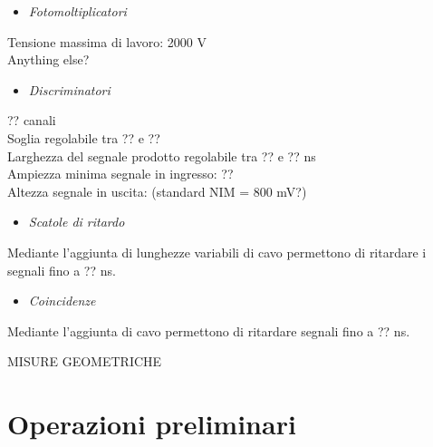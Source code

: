 \documentclass[11pt]{article}
\begin{document}
\begin{itemize}
\item \textit{Fotomoltiplicatori}
\end{itemize}
Tensione massima di lavoro: 2000 V \\
Anything else?

\begin{itemize}
\item \textit{Discriminatori}
\end{itemize}
?? canali \\
Soglia regolabile tra ?? e ?? \\
Larghezza del segnale prodotto regolabile tra ?? e ?? ns \\
Ampiezza minima segnale in ingresso: ?? \\
Altezza segnale in uscita: (standard NIM = 800 mV?) \\

\begin{itemize}
\item \textit{Scatole di ritardo}
\end{itemize}
Mediante l'aggiunta di lunghezze variabili di cavo permettono di ritardare i segnali fino a ?? ns.

\begin{itemize}
\item \textit{Coincidenze}
\end{itemize}
Mediante l'aggiunta di cavo permettono di ritardare segnali fino a ?? ns.

MISURE GEOMETRICHE

\section{Operazioni preliminari}
\end{document}
